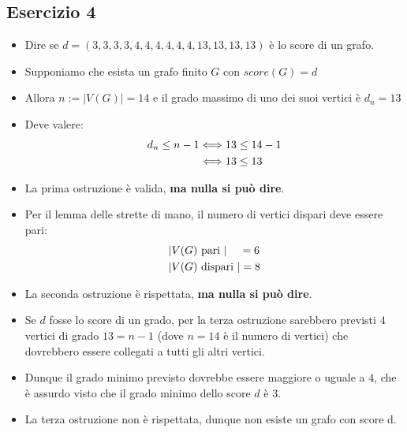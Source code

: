 \documentclass[10pt]{article}
\begin{document}
	\subsection{Esercizio 4}
	\begin{itemize}
	\item
	Dire se $d = (3,3,3,3,4,4,4,4,4,4,13,13,13,13)$ è lo score di un grafo.
	\item
	Supponiamo che esista un grafo finito $G$ con $score(G) = d$
	\item
	Allora $n := |V(G)| = 14$ e il grado massimo di uno dei suoi vertici è $d_n = 13$
	\item
	Deve valere:
	\begin{equation}
	\begin{split}
		d_n \leq n - 1 &\Longleftrightarrow 13 \leq 14 - 1  \\
		&\Longleftrightarrow 13 \leq 13
		\notag
		\end{split}
	\end{equation}
	\item
	La prima ostruzione è valida, \textbf{ma nulla si può dire}.
	\item
	Per il lemma delle strette di mano, il numero di vertici dispari deve essere pari:
	\begin{equation}
	\begin{split}
		|&V(G) \textrm{ pari }| \quad\, =  6\\
		|&V(G) \textrm{ dispari }| = 8 
		\notag
		\end{split}
	\end{equation}
	\item
	La seconda ostruzione è rispettata, \textbf{ma nulla si può dire}.
	\item
	Se $d$ fosse lo score di un grado, per la terza ostruzione sarebbero previsti $4$ vertici di grado $13 = n-1$ (dove $n=14$ è il numero di vertici) che dovrebbero essere collegati a tutti gli altri vertici.
	\item
	Dunque il grado minimo previsto dovrebbe essere maggiore o uguale a $4$, che è assurdo visto che il grado minimo dello score $d$ è $3$.
	\item
	La terza ostruzione non è rispettata, dunque non esiste un grafo con score d.
	\end{itemize}	
	
\end{document}

